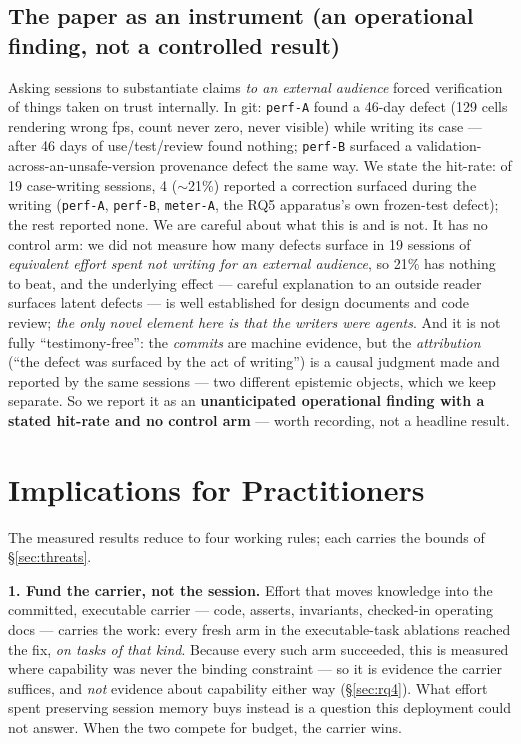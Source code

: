 \documentclass[10pt,conference]{IEEEtran}   %
\begin{document}
\subsection{The paper as an instrument (an operational finding, not a controlled result)}
\label{sec:instrument}
Asking sessions to substantiate claims \emph{to an external audience} forced verification of
things taken on trust internally. In git: \texttt{perf-A} found a 46-day defect (129 cells
rendering wrong fps, count never zero, never visible) while writing its case --- after 46 days of
use/test/review found nothing; \texttt{perf-B} surfaced a validation-across-an-unsafe-version
provenance defect the same way. We state the hit-rate: of 19 case-writing sessions,
4 ($\sim$21\%) reported a correction surfaced during the writing (\texttt{perf-A},
\texttt{perf-B}, \texttt{meter-A}, the RQ5 apparatus's own frozen-test defect); the rest
reported none. We are careful about what this is and is not. It has no control arm: we did
not measure how many defects surface in 19 sessions of \emph{equivalent effort spent not writing for
an external audience}, so 21\% has nothing to beat, and the underlying effect --- careful explanation
to an outside reader surfaces latent defects --- is well established for design documents and code
review; \emph{the only novel element here is that the writers were agents}. And it is not fully
``testimony-free'': the \emph{commits} are machine evidence, but the \emph{attribution} (``the defect
was surfaced by the act of writing'') is a causal judgment made and reported by the same sessions ---
two different epistemic objects, which we keep separate. So we report it as an \textbf{unanticipated
operational finding with a stated hit-rate and no control arm} --- worth recording, not a headline
result.

\section{Implications for Practitioners}
\label{sec:implications}
The measured results reduce to four working rules; each carries the bounds of \S\ref{sec:threats}.

\textbf{1. Fund the carrier, not the session.} Effort that moves knowledge into the committed,
executable carrier --- code, asserts, invariants, checked-in operating docs --- carries the work: every fresh arm in the executable-task ablations reached the fix,
\emph{on tasks of that kind}. Because every such arm succeeded, this is measured where capability
was never the binding constraint --- so it is evidence the carrier suffices, and \emph{not} evidence
about capability either way (\S\ref{sec:rq4}). What effort spent preserving session memory buys
instead is a question this deployment could not answer. When the two compete for budget, the
carrier wins.
\end{document}
